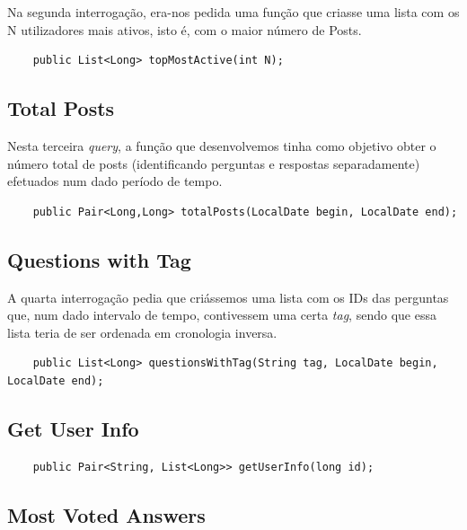 \documentclass[a4paper, 11pt, oneside]{article}
\begin{document}
Na segunda interrogação, era-nos pedida uma função que criasse uma lista com os N utilizadores mais ativos, isto é, com o maior número de Posts.

\begin{lstlisting}
	public List<Long> topMostActive(int N);
\end{lstlisting}




\subsection{Total Posts}

Nesta terceira \textit{query}, a função que desenvolvemos tinha como objetivo obter o número total de posts (identificando perguntas e respostas separadamente) 
efetuados num dado período de tempo.

\begin{lstlisting}
	public Pair<Long,Long> totalPosts(LocalDate begin, LocalDate end);
\end{lstlisting}



\subsection{Questions with Tag}

A quarta interrogação pedia que criássemos uma lista com os IDs das perguntas que, num dado intervalo de tempo, contivessem uma certa \textit{tag}, sendo que essa 
lista teria de ser ordenada em cronologia inversa.

\begin{lstlisting}
	public List<Long> questionsWithTag(String tag, LocalDate begin, LocalDate end);
\end{lstlisting}


\subsection{Get User Info}

\begin{lstlisting}
	public Pair<String, List<Long>> getUserInfo(long id);
\end{lstlisting}



\subsection{Most Voted Answers}
\end{document}
